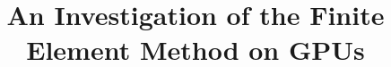 \documentclass[a4paper, oneside, 11pt]{report}
\title{An Investigation of the Finite Element Method on GPUs}
\begin{document}









\clearpage



\tableofcontents
\clearpage
{}
\listoffigures
\clearpage
{}
\listoftables
\clearpage
{}
















\clearpage
\renewcommand*{\thesection}{}\textbf{}






\appendix
\renewcommand*{\thesection}{\Alph{section}}\textbf{}

\begin{appendices}

\end{appendices}
\end{document}
